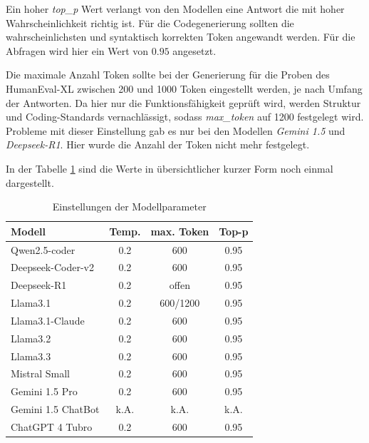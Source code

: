 Ein hoher \textit{top\_p} Wert verlangt von den Modellen eine Antwort die mit hoher Wahrscheinlichkeit richtig ist. Für die Codegenerierung sollten die wahrscheinlichsten und syntaktisch korrekten Token angewandt werden. Für die Abfragen wird hier ein Wert von $0.95$ angesetzt.\vspace{0.2cm}

Die maximale Anzahl Token sollte bei der Generierung für die Proben des HumanEval-XL zwischen 200 und 1000 Token eingestellt werden, je nach Umfang der Antworten. Da hier nur die Funktionsfähigkeit geprüft wird, werden Struktur und Coding-Standards vernachlässigt, sodass \textit{max\_token} auf 1200 festgelegt wird. Probleme mit dieser Einstellung gab es nur bei den Modellen \textit{Gemini 1.5} und \textit{Deepseek-R1}. Hier wurde die Anzahl der Token nicht mehr festgelegt.\vspace{0.2cm}

In der Tabelle \ref{tab:params_for_llms} sind die Werte in übersichtlicher kurzer Form noch einmal dargestellt.

\begin{table}[!ht]
	\begin{tabular}{|l|c|c|c|}
		\hline
		\textbf{Modell} & \textbf{Temp.} & \textbf{max. Token} & \textbf{Top-p} \\
		\hline
		Qwen2.5-coder      &  0.2 &       600 & 0.95 \\
		Deepseek-Coder-v2  &  0.2 &       600 & 0.95 \\
		Deepseek-R1        &  0.2 &     offen & 0.95 \\
		Llama3.1           &  0.2 &  600/1200 & 0.95 \\
		Llama3.1-Claude    &  0.2 &       600 & 0.95 \\
		Llama3.2           &  0.2 &       600 & 0.95 \\
		Llama3.3           &  0.2 &       600 & 0.95 \\
		Mistral Small      &  0.2 &       600 & 0.95 \\
		Gemini 1.5 Pro     &  0.2 &       600 & 0.95 \\
		Gemini 1.5 ChatBot & k.A. &      k.A. & k.A. \\
		ChatGPT 4 Tubro    &  0.2 &       600 & 0.95 \\
		\hline
		\hline
	\end{tabular}
	\centering
	\caption{Einstellungen der Modellparameter}
	\label{tab:params_for_llms}
\end{table}

